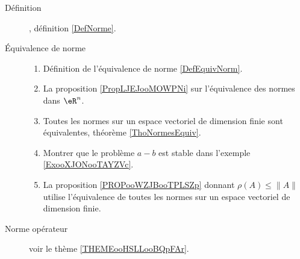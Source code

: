 
      \label{THEMEooUJVXooZdlmHj}


\begin{description}
    \item[Définition], définition \ref{DefNorme}.
    \item[Équivalence de norme] 

        \begin{enumerate}


        \item
            Définition de l'équivalence de norme \ref{DefEquivNorm}.
\item
    La proposition \ref{PropLJEJooMOWPNi} sur l'équivalence des normes dans \( \eR^n\).
\item
    Toutes les normes sur un espace vectoriel de dimension finie sont équivalentes, théorème \ref{ThoNormesEquiv}.
\item
    Montrer que le problème \( a-b\) est stable dans l'exemple \ref{ExooXJONooTAYZVc}.
\item
    La proposition \ref{PROPooWZJBooTPLSZp} donnant \( \rho(A)\leq \| A \|\) utilise l'équivalence de toutes les normes sur un espace vectoriel de dimension finie.
                
        \end{enumerate}

    \item[Norme opérateur] voir le thème \ref{THEMEooHSLLooBQpFAr}.

\end{description}
